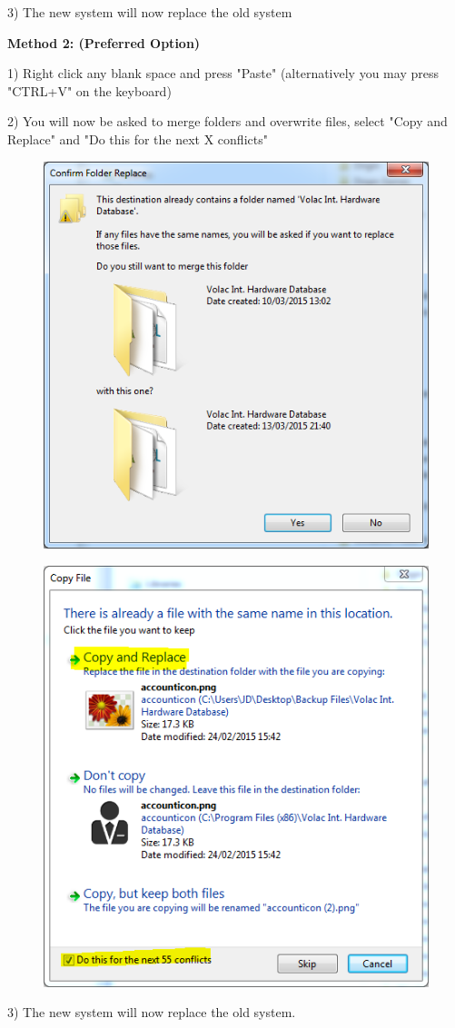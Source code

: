 3) The new system will now replace the old system

\textbf{Method 2: (Preferred Option)}

1) Right click any blank space and press "Paste" (alternatively you may press "CTRL+V" on the keyboard)

2) You will now be asked to merge folders and overwrite files, select "Copy and Replace" and "Do this for the next X conflicts"

\begin{figure}[H]
    \includegraphics[width=\textwidth]{./Manual/Images/restore3.png}
\end{figure}

\begin{figure}[H]
    \includegraphics[width=\textwidth]{./Manual/Images/restore4.png}
\end{figure}

3) The new system will now replace the old system. 